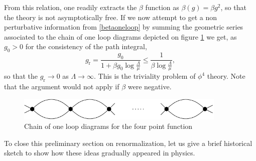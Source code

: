 \documentclass[10pt,here,feynmf]{article}
\begin{document}
From this relation, one readily extracts the $\beta$ function as $\beta(g)=\beta g^{2}$, so that the theory is not asymptotically free. If we now attempt to get a non perturbative information from \eqref{betaoneloop} by summing the geometric series associated to the chain of one loop diagrams depicted on figure \ref{chaindia} we get, as $g_{0}>0$ for the consistency of the path integral,
\begin{equation}
g_{\mathrm{r}}=\frac{g_{0}}{1+\beta g_{0}\log\frac{\Lambda}{\mu}}\leq\frac{1}{\beta\log\frac{\Lambda}{\mu}},
\end{equation}
so that the $g_{\mathrm{r}}\rightarrow 0$ as $\Lambda\rightarrow\infty$. This is the triviality problem of $\phi^{4}$ theory. Note that the argument would not apply if $\beta$ were negative.

\begin{figure}
\begin{center}
\includegraphics[width=10cm]{chain.pdf}
\caption{Chain of one loop diagrams for the four point function}
\label{chaindia}
\end{center}
\end{figure}



To close this preliminary section on renormalization, let us give a brief historical sketch to show how these ideas gradually appeared in physics.
\end{document}
